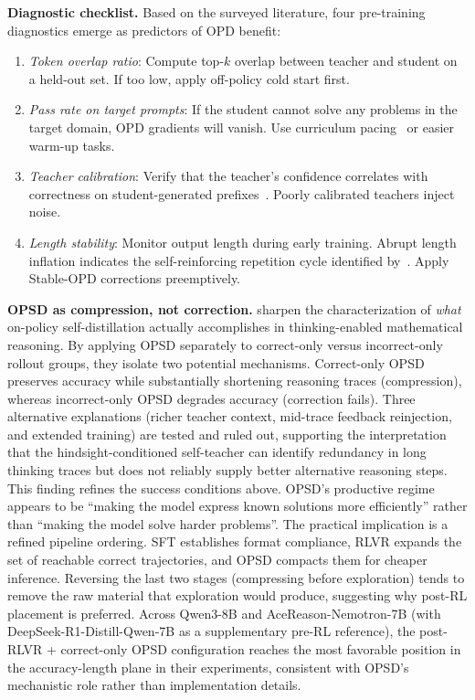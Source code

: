 \documentclass{article} %
\begin{document}
\textbf{Diagnostic checklist.} Based on the surveyed literature, four pre-training diagnostics emerge as predictors of OPD benefit:
\begin{enumerate}[nosep]
    \item \textit{Token overlap ratio}: Compute top-$k$ overlap between teacher and student on a held-out set. If too low, apply off-policy cold start first.
    \item \textit{Pass rate on target prompts}: If the student cannot solve any problems in the target domain, OPD gradients will vanish. Use curriculum pacing~\citep{2603.11178} or easier warm-up tasks.
    \item \textit{Teacher calibration}: Verify that the teacher's confidence correlates with correctness on student-generated prefixes~\citep{2604.16830}. Poorly calibrated teachers inject noise.
    \item \textit{Length stability}: Monitor output length during early training. Abrupt length inflation indicates the self-reinforcing repetition cycle identified by~\citet{2604.08527}. Apply Stable-OPD corrections preemptively.
\end{enumerate}

\textbf{OPSD as compression, not correction.} \citet{2605.06188} sharpen the characterization of \emph{what} on-policy self-distillation actually accomplishes in thinking-enabled mathematical reasoning. By applying OPSD separately to correct-only versus incorrect-only rollout groups, they isolate two potential mechanisms. Correct-only OPSD preserves accuracy while substantially shortening reasoning traces (compression), whereas incorrect-only OPSD degrades accuracy (correction fails). Three alternative explanations (richer teacher context, mid-trace feedback reinjection, and extended training) are tested and ruled out, supporting the interpretation that the hindsight-conditioned self-teacher can identify redundancy in long thinking traces but does not reliably supply better alternative reasoning steps. This finding refines the success conditions above. OPSD's productive regime appears to be ``making the model express known solutions more efficiently'' rather than ``making the model solve harder problems''. The practical implication is a refined pipeline ordering. SFT establishes format compliance, RLVR expands the set of reachable correct trajectories, and OPSD compacts them for cheaper inference. Reversing the last two stages (compressing before exploration) tends to remove the raw material that exploration would produce, suggesting why post-RL placement is preferred. Across Qwen3-8B and AceReason-Nemotron-7B (with DeepSeek-R1-Distill-Qwen-7B as a supplementary pre-RL reference), the post-RLVR + correct-only OPSD configuration reaches the most favorable position in the accuracy-length plane in their experiments, consistent with OPSD's mechanistic role rather than implementation details.
\end{document}
